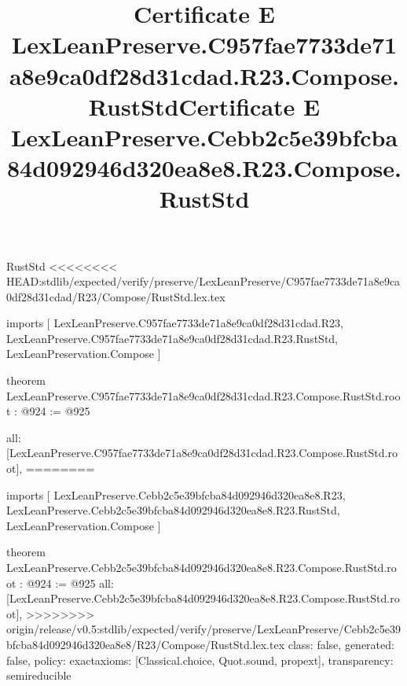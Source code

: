 \begin{lexlean}{RustStd}
<<<<<<<< HEAD:stdlib/expected/verify/preserve/LexLeanPreserve/C957fae7733de71a8e9ca0df28d31cdad/R23/Compose/RustStd.lex.tex
\title{Certificate E LexLeanPreserve.C957fae7733de71a8e9ca0df28d31cdad.R23.Compose.RustStd}
\begin{coremodule}
imports [
  LexLeanPreserve.C957fae7733de71a8e9ca0df28d31cdad.R23,
  LexLeanPreserve.C957fae7733de71a8e9ca0df28d31cdad.R23.RustStd,
  LexLeanPreservation.Compose
]

theorem LexLeanPreserve.C957fae7733de71a8e9ca0df28d31cdad.R23.Compose.RustStd.root : @924 := @925 {
  all: [LexLeanPreserve.C957fae7733de71a8e9ca0df28d31cdad.R23.Compose.RustStd.root],
========
\title{Certificate E LexLeanPreserve.Cebb2c5e39bfcba84d092946d320ea8e8.R23.Compose.RustStd}
\begin{coremodule}
imports [
  LexLeanPreserve.Cebb2c5e39bfcba84d092946d320ea8e8.R23,
  LexLeanPreserve.Cebb2c5e39bfcba84d092946d320ea8e8.R23.RustStd,
  LexLeanPreservation.Compose
]

theorem LexLeanPreserve.Cebb2c5e39bfcba84d092946d320ea8e8.R23.Compose.RustStd.root : @924 := @925 {
  all: [LexLeanPreserve.Cebb2c5e39bfcba84d092946d320ea8e8.R23.Compose.RustStd.root],
>>>>>>>> origin/release/v0.5:stdlib/expected/verify/preserve/LexLeanPreserve/Cebb2c5e39bfcba84d092946d320ea8e8/R23/Compose/RustStd.lex.tex
  class: false,
  generated: false,
  policy: exact{axioms: [Classical.choice, Quot.sound, propext]},
  transparency: semireducible
}


\end{coremodule}}
\end{coremodule}
\end{lexlean}
